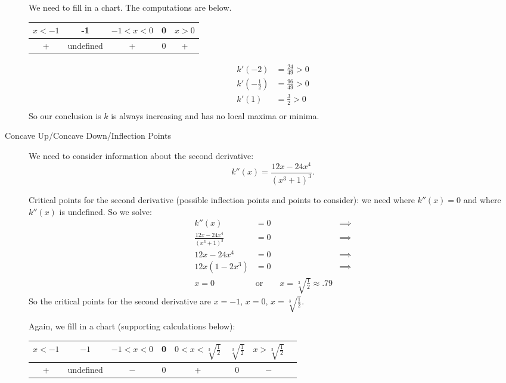 \documentclass[10pt]{amsart}
\theoremstyle{definition}
\theoremstyle{remark}
\begin{document}
\begin{description}
We need to fill in a chart. The computations are below.
\begin{center}
\begin{tabular}{c | c | c | c |c}
$x < -1$ & -1 & $-1 < x < 0$ & 0 & $x > 0$ \\
\hline
+& undefined &+ &0 & +
\end{tabular}
\end{center}
%
\begin{align*}
k'(-2) &=  \frac{24}{49} >0 \\
k'(-\frac{1}{2}) &= \frac{96}{49} >0\\
k'(1) &= \frac{3}{2} >0 \\
\end{align*}
%
So our conclusion is $k$ is always increasing and has no local maxima or minima.

\item[Concave Up/Concave Down/Inflection Points]

We need to consider information about the second derivative:
$$k''(x) = \frac{12 x-24 x^4}{\left(x^3+1\right)^3}.$$

Critical points for the second derivative (possible inflection points and points to consider): we need where $k''(x) = 0$ and where $k''(x)$ is undefined. So we solve:
%
\begin{align*}
k''(x)&=0 & \implies \\
\frac{12 x-24 x^4}{\left(x^3+1\right)^3} &=0 & \implies\\
12 x-24 x^4 &= 0 & \implies \\
12x(1 - 2x^{3}) &= 0 & \implies \\
x = 0 \qquad  &\text{or} \qquad x=\sqrt[3]{\frac{1}{2}} \approx .79
\end{align*}
%
So the critical points for the second derivative are $x = -1$, $x = 0$, $x = \sqrt[3]{\frac{1}{2}}$.

Again, we fill in a chart (supporting calculations below):
\begin{center}
\begin{tabular}{c | c | c | c | c | c | c | c}
$x < -1$ & $-1$ & $-1 < x < 0$ & 0 & $0 < x < \sqrt[3]{\frac{1}{2}}$ &$\sqrt[3]{\frac{1}{2}}$ & $x > \sqrt[3]{\frac{1}{2}}$ \\ \hline
 + & undefined & $-$ & 0 & + & 0 &$ -$\\
  \end{tabular}
  \end{center}


\end{description}
\end{document}
